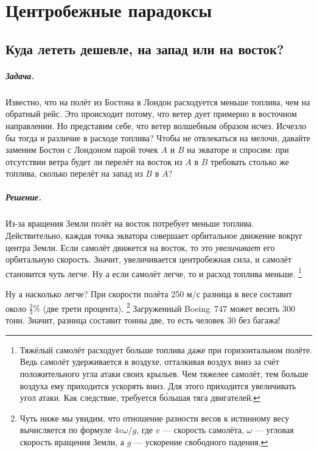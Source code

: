 \chapter{Центробежные парадоксы}

\section{Куда лететь дешевле, на запад или на восток?}

\paragraph{Задача.}
Известно, что на полёт из Бостона в Лондон расходуется меньше топлива, чем на обратный рейс.
Это происходит потому, что ветер дует примерно в восточном направлении.
Но представим себе, что ветер волшебным образом исчез.
Исчезло бы тогда и различие в расходе топлива?
Чтобы не отвлекаться на мелочи, давайте заменим Бостон с Лондоном парой точек $A$ и $B$ на экваторе и спросим: при отсутствии ветра будет ли перелёт на восток из $A$ в $B$ требовать столько же топлива, сколько перелёт на запад из $B$ в $A$?

\paragraph{Решение.}
Из-за вращения Земли полёт на восток потребует меньше топлива.
Действительно, каждая точка экватора совершает орбитальное движение вокруг центра Земли.
Если самолёт движется на восток, то это \emph{увеличивает} его орбитальную скорость.
Значит, увеличивается центробежная сила, и самолёт становится чуть легче.
Ну а если самолёт легче, то и расход топлива меньше.%
\footnote{Тяжёлый самолёт расходует больше топлива даже при горизонтальном полёте.
Ведь самолёт удерживается в воздухе, отталкивая воздух вниз за счёт положительного угла атаки своих крыльев.
Чем тяжелее самолёт, тем больше воздуха ему приходится ускорять вниз.
Для этого приходится увеличивать угол атаки.
Как следствие, требуется б\'{о}льшая тяга двигателей.}

Ну а насколько легче?
При скорости полёта 250 м/с разница в весе составит около $
\tfrac23 \%$ (две трети процента).%
\footnote{Чуть ниже мы увидим, что отношение разности весов к истинному весу вычисляется по формуле
$4v\omega/g$,
где $v$ --- скорость самолёта,
$\omega$ --- угловая скорость вращения Земли,
а $g$ --- ускорение свободного падения.}
Загруженный Boeing~747 может весить 300 тонн.
Значит, разница составит тонны две, то есть человек 30 без багажа!

